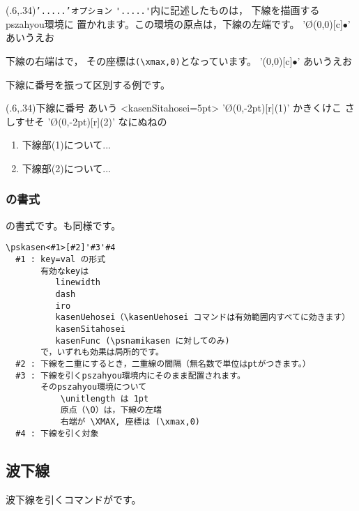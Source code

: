 \documentclass[a4j]{jarticle}
\begin{document}
\begin{showEx}(.6,.34){\texttt{'.....'オプション}}
\verb+'.....'+内に記述したものは，
下線を描画する\textsf{pszahyou}環境に
置かれます。この環境の原点は，下線の左端です。
\pskasen%
  '\Put\O(0,0)[c]{$\bullet$}'%
  {あいうえお}

下線の右端はで，
その座標は\verb+(\xmax,0)+となっています。
\pskasen%
  '\Put\XMAX(0,0)[c]{$\bullet$}'%
  {あいうえお}
\end{showEx}

下線に番号を振って区別する例です。

\begin{showEx}(.6,.34){下線に番号}
あいう
\pskasen<kasenSitahosei=5pt>%
  '\Put\O(0,-2pt)[r]{\scriptsize (1)}'%
  {かきくけこ}
さしすせそ
\pskasen%
  '\Put\O(0,-2pt)[r]{\scriptsize (2)}'%
  {なにぬねの}
\begin{enumerate}[(1)]
  \item 下線部(1)について...
  \item 下線部(2)について...
\end{enumerate}
\end{showEx}
\newpage

\subsubsection{\texorpdfstring{}{pskasen}の書式}
の書式です。も同様です。

\begin{boxnote}
\begin{verbatim}
\pskasen<#1>[#2]'#3'#4
  #1 : key=val の形式
       有効なkeyは
          linewidth
          dash
          iro
          kasenUehosei（\kasenUehosei コマンドは有効範囲内すべてに効きます）
          kasenSitahosei
          kasenFunc (\psnamikasen に対してのみ)
       で，いずれも効果は局所的です。
  #2 : 下線を二重にするとき，二重線の間隔（無名数で単位はptがつきます。）
  #3 : 下線を引くpszahyou環境内にそのまま配置されます。
       そのpszahyou環境について
           \unitlength は 1pt
           原点（\O）は，下線の左端
           右端が \XMAX, 座標は (\xmax,0)
  #4 : 下線を引く対象
\end{verbatim}
\end{boxnote}

\subsection{波下線}
波下線を引くコマンドがです。
\end{document}
